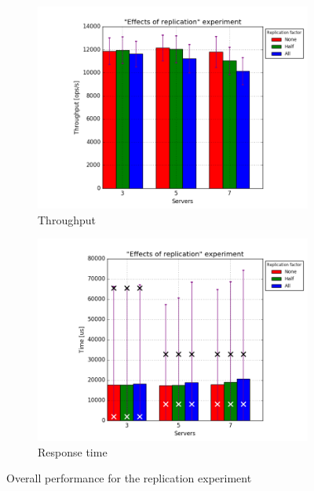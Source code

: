 \documentclass[11pt]{article}
\begin{document}
\begin{figure}
\centering
\begin{subfigure}{.5\textwidth}
	\centering
	\includegraphics[width=\linewidth]{plots/replication}
	\caption{Throughput}
	\label{fig:replication-throughput}
\end{subfigure}%
\begin{subfigure}{.5\textwidth}
	\centering
	\includegraphics[width=\linewidth]{plots/replication-response_time}
	\caption{Response time}
	\label{fig:replication-reponse-time}
\end{subfigure}
\caption{Overall performance for the replication experiment}
\label{fig:replication-overall}
\end{figure}
\end{document}
